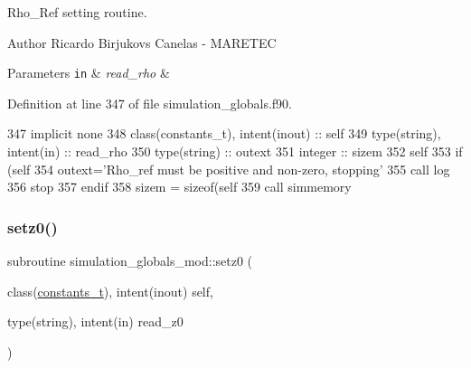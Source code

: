 Rho\+\_\+\+Ref setting routine. 

\begin{DoxyAuthor}{Author}
Ricardo Birjukovs Canelas -\/ M\+A\+R\+E\+T\+EC
\end{DoxyAuthor}

\begin{DoxyParams}[1]{Parameters}
\mbox{\tt in}  & {\em read\+\_\+rho} & \\
\hline
\end{DoxyParams}


Definition at line 347 of file simulation\+\_\+globals.\+f90.


\begin{DoxyCode}
347     \textcolor{keywordtype}{implicit none}
348     \textcolor{keywordtype}{class}(constants\_t), \textcolor{keywordtype}{intent(inout)} :: self
349     \textcolor{keywordtype}{type}(string), \textcolor{keywordtype}{intent(in)} :: read\_rho
350     \textcolor{keywordtype}{type}(string) :: outext
351     \textcolor{keywordtype}{integer} :: sizem
352     self%
353     \textcolor{keywordflow}{if} (self%
354         outext=\textcolor{stringliteral}{'Rho\_ref must be positive and non-zero, stopping'}
355         \textcolor{keyword}{call }log%
356         stop
357 \textcolor{keywordflow}{    endif}
358     sizem = sizeof(self%
359     \textcolor{keyword}{call }simmemory%
\end{DoxyCode}
\mbox{\label{namespacesimulation__globals__mod_a64b1d91147c1cd5898fec8f23d56a65d}} 
\subsubsection{\texorpdfstring{setz0()}{setz0()}}
{\footnotesize\ttfamily subroutine simulation\+\_\+globals\+\_\+mod\+::setz0 (\begin{DoxyParamCaption}\item[{class(\mbox{\hyperlink{structsimulation__globals__mod_1_1constants__t}{constants\+\_\+t}}), intent(inout)}]{self,  }\item[{type(string), intent(in)}]{read\+\_\+z0 }\end{DoxyParamCaption})\hspace{0.3cm}{\ttfamily [private]}}




